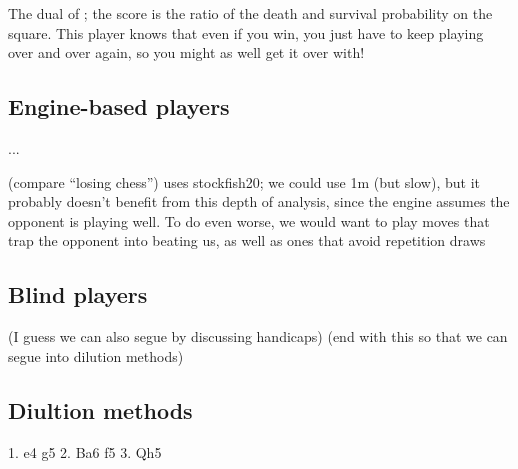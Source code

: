 \documentclass[10pt,preprint,twocolumn]{acmart}
\begin{document}
 The dual of ; the score is
the ratio of the death and survival probability on the square. This
player knows that even if you win, you just have to keep playing over
and over again, so you might as well get it over with!

\subsection{Engine-based players}

...


 (compare ``losing chess'')
uses stockfish20; we could use 1m (but slow), but it
probably doesn't benefit from this depth of analysis,
since the engine assumes the opponent is playing well.
To do even worse, we would want to play moves that
trap the opponent into beating us, as well as ones that 
avoid repetition draws

 \deterministic
{}

\subsection{Blind players}


(I guess we can also segue by discussing handicaps)
(end with this so that we can segue into dilution methods)

\subsection{Diultion methods}
1. e4 g5 2. Ba6 f5 3. Qh5


\end{document}
